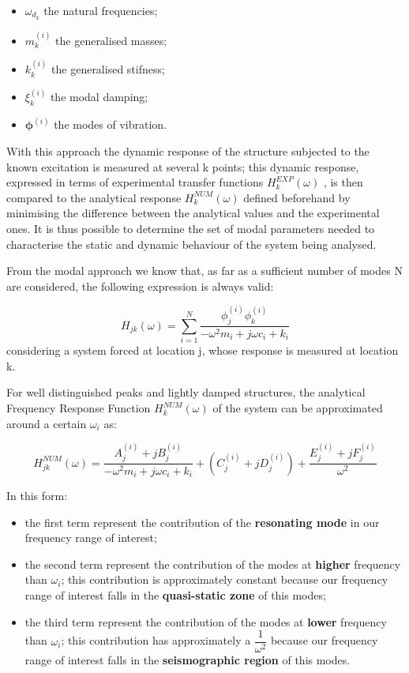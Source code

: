 \documentclass[a4paper,12pt,oneside]{article}
\begin{document}
\begin{itemize}
\item $ \omega_{d_k} $ the natural frequencies;
\item $ m_k ^{(i)} $ the generalised masses;
\item $ k_k ^{(i)} $ the generalised stifness;
\item $ \xi_k ^{(i)} $ the modal damping;
\item $	\mathbf{ \phi }^{(i)} $ the modes of vibration.
\end{itemize}

With this approach the dynamic response of the structure subjected to the known excitation is measured at several k points; this dynamic response, expressed in terms of experimental
transfer functions $H_k ^{EXP} ( \omega) $ , is then compared to the analytical response $H_k ^{NUM} ( \omega) $ defined beforehand by minimising the difference between the analytical values and the experimental ones. It is thus possible to determine the set of modal parameters needed to characterise the static and dynamic behaviour of the system being analysed.

From the modal approach we know that, as far as a sufficient number of modes N are considered, the following expression is always valid:

\[
H_{jk} (\omega) = \sum_{i=1}^{N} \dfrac{\phi_{j}^{(i)} \phi_{k}^{(i)}}
{-\omega^2 m_i +j \omega c_i + k_i}
\]
considering a system forced at location j, whose response is measured at location k.


For well distinguished peaks and lightly damped structures, the analytical Frequency Response Function $H_k ^ {NUM} ( \omega) $ of the system can be approximated around a certain $\omega_i$ as:

\[	
H_{jk}^{NUM} (\omega) = \dfrac{A_{j}^{(i)} + jB_{j}^{(i)}}
{-\omega^2 m_i +j \omega c_i + k_i}
+ (C_{j}^{(i)} + jD_{j}^{(i)})
+ \dfrac{E_{j}^{(i)} + jF_{j}^{(i)}}{\omega^2}
\]

In this form:

\begin{itemize}
\item the first term represent the contribution of the \textbf{resonating mode} in our frequency range of interest;
\item the second term represent the contribution of the modes at \textbf{higher} frequency than $\omega_i$; this contribution is approximately constant because our frequency range of interest falls in the \textbf{quasi-static zone} of this modes;
\item the third term represent the contribution of the modes at \textbf{lower} frequency than $\omega_i$; this contribution has approximately a $\dfrac{1}{\omega^2}$ because our frequency range of interest falls in the \textbf{seismographic region} of this modes.
\end{itemize}
\end{document}
